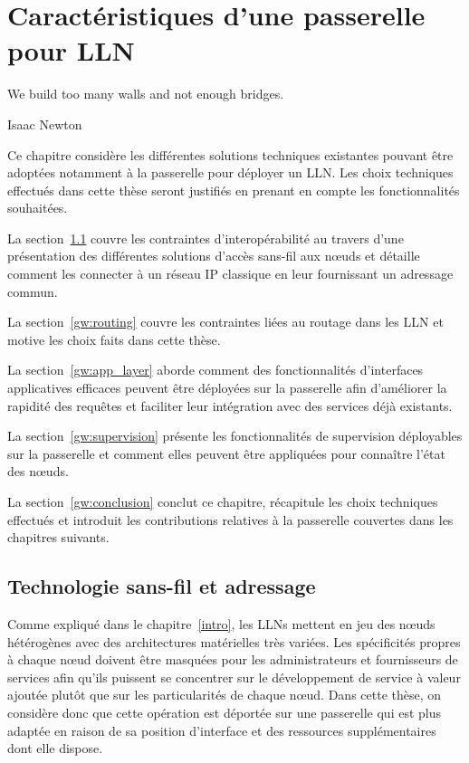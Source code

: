 
\chapter{Caractéristiques d'une passerelle pour \ac{LLN}}
\label{gw}

\epigraph{We build too many walls and not enough bridges.}{Isaac Newton}

\minitoc

Ce chapitre considère les différentes solutions techniques existantes pouvant être adoptées notamment à la passerelle pour déployer un \ac{LLN}.
Les choix techniques effectués dans cette thèse seront justifiés en prenant en compte les fonctionnalités souhaitées.

La section~\ref{gw:interop} couvre les contraintes d'interopérabilité au travers d'une présentation des différentes solutions d'accès sans-fil aux nœuds et détaille comment les connecter à un réseau IP classique en leur fournissant un adressage commun.

La section~\ref{gw:routing} couvre les contraintes liées au routage dans les \ac{LLN} et motive les choix faits dans cette thèse.

La section~\ref{gw:app_layer} aborde comment des fonctionnalités d'interfaces applicatives efficaces peuvent être déployées sur la passerelle afin d'améliorer la rapidité des requêtes et faciliter leur intégration avec des services déjà existants.

La section~\ref{gw:supervision} présente les fonctionnalités de supervision déployables sur la passerelle et comment elles peuvent être appliquées pour connaître l'état des nœuds.

La section~\ref{gw:conclusion} conclut ce chapitre, récapitule les choix techniques effectués et introduit les contributions relatives à la passerelle couvertes dans les chapitres suivants.

\section{Technologie sans-fil et adressage}
\label{gw:interop}

Comme expliqué dans le chapitre~\ref{intro}, les \ac{LLN}s mettent en jeu des nœuds hétérogènes avec des architectures matérielles très variées.
Les spécificités propres à chaque nœud doivent être masquées pour les administrateurs et fournisseurs de services afin qu'ils puissent se concentrer sur le développement de service à valeur ajoutée plutôt que sur les particularités de chaque nœud.
Dans cette thèse, on considère donc que cette opération est déportée sur une passerelle qui est plus adaptée en raison de sa position d'interface et des ressources supplémentaires dont elle dispose.

